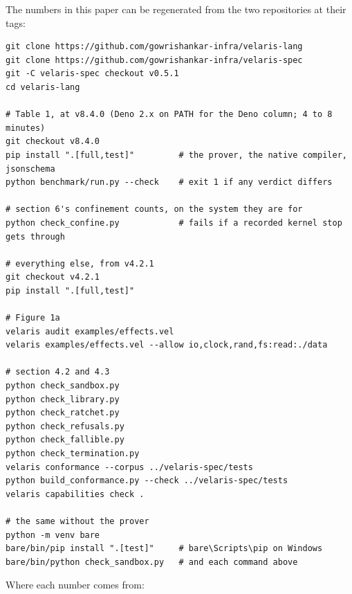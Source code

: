 \documentclass[
]{article}
\begin{document}
The numbers in this paper can be regenerated from the two repositories
at their tags:

\begin{verbatim}
git clone https://github.com/gowrishankar-infra/velaris-lang
git clone https://github.com/gowrishankar-infra/velaris-spec
git -C velaris-spec checkout v0.5.1
cd velaris-lang

# Table 1, at v8.4.0 (Deno 2.x on PATH for the Deno column; 4 to 8 minutes)
git checkout v8.4.0
pip install ".[full,test]"         # the prover, the native compiler, jsonschema
python benchmark/run.py --check    # exit 1 if any verdict differs

# section 6's confinement counts, on the system they are for
python check_confine.py            # fails if a recorded kernel stop gets through

# everything else, from v4.2.1
git checkout v4.2.1
pip install ".[full,test]"

# Figure 1a
velaris audit examples/effects.vel
velaris examples/effects.vel --allow io,clock,rand,fs:read:./data

# section 4.2 and 4.3
python check_sandbox.py
python check_library.py
python check_ratchet.py
python check_refusals.py
python check_fallible.py
python check_termination.py
velaris conformance --corpus ../velaris-spec/tests
python build_conformance.py --check ../velaris-spec/tests
velaris capabilities check .

# the same without the prover
python -m venv bare
bare/bin/pip install ".[test]"     # bare\Scripts\pip on Windows
bare/bin/python check_sandbox.py   # and each command above
\end{verbatim}

Where each number comes from:
\end{document}
